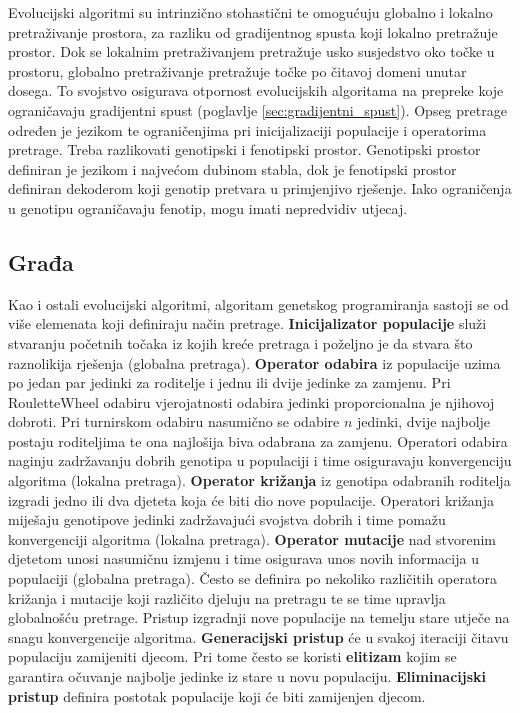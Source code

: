 \documentclass[times, utf8, numeric, diplomski]{fer}
\def\secref#1{(poglavlje \ref{#1})}
\begin{document}
Evolucijski algoritmi su intrinzično stohastični te omogućuju globalno i lokalno pretraživanje prostora, za razliku od gradijentnog spusta koji lokalno pretražuje prostor. Dok se lokalnim pretraživanjem pretražuje usko susjedstvo oko točke u prostoru, globalno pretraživanje pretražuje točke po čitavoj domeni unutar dosega. To svojstvo osigurava otpornost evolucijskih algoritama na prepreke koje ograničavaju gradijentni spust \secref{sec:gradijentni_spust}. Opseg pretrage određen je jezikom te ograničenjima pri inicijalizaciji populacije i operatorima pretrage. Treba razlikovati genotipski i fenotipski prostor. Genotipski prostor definiran je jezikom i najvećom dubinom stabla, dok je fenotipski prostor definiran dekoderom koji genotip pretvara u primjenjivo rješenje. Iako ograničenja u genotipu ograničavaju fenotip, mogu imati nepredvidiv utjecaj.

\subsection{Građa}
Kao i ostali evolucijski algoritmi, algoritam genetskog programiranja sastoji se od više elemenata koji definiraju način pretrage. \textbf{Inicijalizator populacije} služi stvaranju početnih točaka iz kojih kreće pretraga i poželjno je da stvara što raznolikija rješenja (globalna pretraga). \textbf{Operator odabira} iz populacije uzima po jedan par jedinki za roditelje i jednu ili dvije jedinke za zamjenu. Pri RouletteWheel odabiru vjerojatnosti odabira jedinki proporcionalna je njihovoj dobroti. Pri turnirskom odabiru nasumično se odabire $n$ jedinki, dvije najbolje postaju roditeljima te ona najlošija biva odabrana za zamjenu. Operatori odabira naginju zadržavanju dobrih genotipa u populaciji i time osiguravaju konvergenciju algoritma (lokalna pretraga). \textbf{Operator križanja} iz genotipa odabranih roditelja izgradi jedno ili dva djeteta koja će biti dio nove populacije. Operatori križanja miješaju genotipove jedinki zadržavajući svojstva dobrih i time pomažu konvergenciji algoritma (lokalna pretraga). \textbf{Operator mutacije} nad stvorenim djetetom unosi nasumičnu izmjenu i time osigurava unos novih informacija u populaciji (globalna pretraga). Često se definira po nekoliko različitih operatora križanja i mutacije koji različito djeluju na pretragu te se time upravlja globalnošću pretrage. Pristup izgradnji nove populacije na temelju stare utječe na snagu konvergencije algoritma. \textbf{Generacijski pristup} će u svakoj iteraciji čitavu populaciju zamijeniti djecom. Pri tome često se koristi \textbf{elitizam} kojim se garantira očuvanje najbolje jedinke iz stare u novu populaciju. \textbf{Eliminacijski pristup} definira postotak populacije koji će biti zamijenjen djecom.
\end{document}
